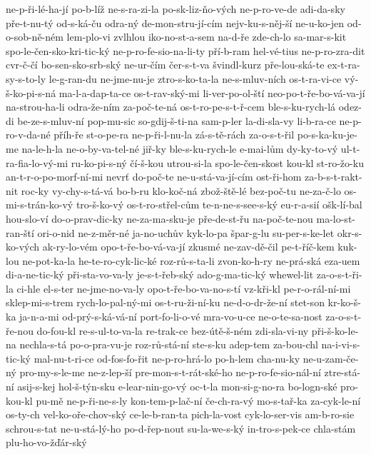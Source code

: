 ne-p-ři-lé-ha-jí
po-b-líž
ne-s-ra-zi-la
po-sk-liz-ňo-vých
ne-p-ro-ve-de
adi-da-sky
pře-t-nu-tý
od-s-ká-ču
odra-ný
de-mon-stru-jí-cím
nejv-ku-s-něj-ší
ne-u-ko-jen
od-o-sob-ně-ném
lem-plo-vi
zvlhlou
iko-no-st-a-sem
na-d-ře
zde-ch-lo
sa-mar-s-kit
spo-le-čen-sko-kri-tic-ký
ne-p-ro-fe-sio-na-li-ty
pří-b-ram
hel-vé-tius
ne-p-ro-zra-dit
cvr-č-čí
bo-sen-sko-srb-ský
ne-ur-čím
čer-s-t-va
švindl-kurz
pře-lou-ská-te
ex-t-ra-sy-s-to-ly
le-g-ran-du
ne-jme-nu-je
ztro-s-ko-ta-la
ne-s-mluv-ních
os-t-ra-vi-ce
vý-š-ko-pi-s-ná
ma-l-a-dap-ta-ce
os-t-rav-ský-mi
li-ver-po-ol-ští
neo-po-t-ře-bo-vá-va-jí
na-strou-ha-li
odra-že-ním
za-poč-te-ná
os-t-ro-pe-s-t-ř-cem
ble-s-ku-rych-lá
odez-di
be-ze-s-mluv-ní
pop-mu-sic
so-gdij-š-ti-na
sam-p-ler
la-di-sla-vy
li-b-ra-ce
ne-p-ro-v-da-né
příh-ře
st-o-pe-ra
ne-p-ři-l-nu-la
zá-s-tě-rách
za-o-s-t-řil
po-s-ka-ku-je-me
na-le-h-la
ne-o-by-va-tel-né
jiř-ky
ble-s-ku-rych-le
e-mai-lům
dy-ky-to-vý
ul-t-ra-fia-lo-vý-mi
ru-ko-pi-s-ný
čí-š-kou
utrou-si-la
spo-le-čen-skost
kou-kl
st-ro-žo-ku
an-t-r-o-po-morf-ní-mi
nevrť
do-poč-te
ne-u-stá-va-jí-cím
ost-ři-hom
za-b-s-t-rakt-nit
roc-ky
vy-chy-s-tá-vá
bo-b-ru
klo-koč-ná
zbož-ště-lé
bez-poč-tu
ne-za-č-lo
os-mi-s-trán-ko-vý
tro-š-ko-vý
os-t-ro-střel-cům
te-n-ne-s-see-s-ký
eu-r-a-sií
ošk-lí-bal
hou-slo-ví
do-o-prav-dic-ky
ne-za-ma-sku-je
pře-de-st-řu
na-poč-te-nou
ma-lo-st-ran-ští
ori-o-nid
ne-z-měr-né
ja-no-uchův
kyk-lo-pa
špar-g-lu
su-per-s-ke-let
okr-s-ko-vých
ak-ry-lo-vém
opo-t-ře-bo-vá-va-jí
zkusmé
ne-zav-dě-čil
pe-t-říč-kem
kuk-lou
ne-pot-ka-la
he-te-ro-cyk-lic-ké
roz-rů-s-ta-li
zvon-ko-h-ry
ne-prá-ská
eza-uem
di-a-ne-tic-ký
při-sta-vo-va-ly
je-s-t-řeb-ský
ado-g-ma-tic-ký
whewel-lit
za-o-s-t-ři-la
ci-hle
el-s-ter
ne-jme-no-va-ly
opo-t-ře-bo-va-no-s-tí
vz-kři-kl
pe-r-o-rál-ní-mi
sklep-mi-s-trem
rych-lo-pal-ný-mi
os-t-ru-ži-ní-ku
ne-d-o-dr-že-ní
stet-son
kr-ko-š-ka
ja-n-a-mi
od-prý-s-ká-vá-ní
port-fo-li-o-vé
mra-vo-u-ce
ne-o-te-sa-nost
za-o-s-t-ře-nou
do-fou-kl
re-s-ul-to-va-la
re-trak-ce
bez-útě-š-ném
zdi-sla-vi-ny
při-š-ko-le-na
nechla-s-tá
po-o-pra-vu-je
roz-rů-stá-ní
ste-s-ku
adep-tem
za-bou-chl
na-i-vi-s-tic-ký
mal-nu-t-ri-ce
od-fos-fo-řit
ne-p-ro-hrá-lo
po-h-lem
cha-nu-ky
ne-u-zam-če-ný
pro-my-s-le-me
ne-z-lep-ší
pre-mon-s-t-rát-ské-ho
ne-p-ro-fe-sio-nál-ní
ztre-stá-ní
asij-s-kej
hol-š-týn-sku
e-lear-nin-go-vý
oc-t-la
mon-si-g-no-ra
bo-logn-ské
pro-kou-kl
pu-mě
ne-p-ři-ne-s-ly
kon-tem-p-lač-ní
če-ch-ra-vý
mo-s-tař-ka
za-cyk-le-ní
os-ty-ch
vel-ko-oře-chov-ský
ce-le-b-ran-ta
pich-la-vost
cyk-lo-ser-vis
am-b-ro-sie
schrou-s-tat
ne-u-stá-lý-ho
po-d-řep-nout
su-la-we-s-ký
in-tro-s-pek-ce
chla-stám
plu-ho-vo-žďár-ský
